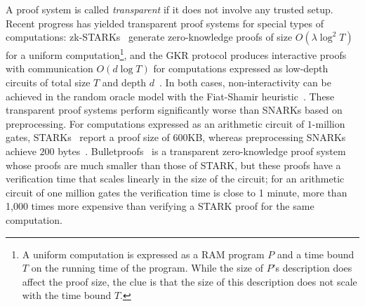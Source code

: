 A proof system is called \emph{transparent} if it does not involve any trusted setup. Recent progress has yielded transparent proof systems for special types of computations: zk-\textsf{STARK}s~\cite{C:BBHR19} generate zero-knowledge proofs of size $O(\lambda \log^2 T)$ for a uniform computation\footnote{A uniform computation is expressed as a RAM program $P$ and a time bound $T$ on the running time of the program. While the size of $P$'s description does affect the proof size, the clue is that the size of this description does not scale with the time bound $T$.}, and the GKR protocol produces interactive proofs with communication $O(d \log T)$ for computations expressed as low-depth circuits of total size $T$ and depth $d$~\cite{STOC:GolKalRot08}. In both cases, non-interactivity can be achieved in the random oracle model with the Fiat-Shamir heuristic~\cite{C:FiaSha86,STOC:CCHLRRW19}.
These transparent proof systems perform significantly worse than SNARKs based on preprocessing. For computations expressed as an arithmetic circuit of $1$-million gates, \textsf{STARK}s~\cite{C:BBHR19} report a proof size of $600$KB, whereas preprocessing SNARKs achieve $200$ bytes~\cite{EC:Groth16}. Bulletproofs~\cite{SP:BBBPWM18, EPRINT:BCCGP16} is a transparent zero-knowledge proof system whose proofs are much smaller than those of \textsf{STARK}, but these proofs have a verification time that scales linearly in the size of the circuit; for an arithmetic circuit of one million gates the verification time is close to 1 minute, more than 1,000 times more expensive than verifying a \textsf{STARK} proof for the same computation. 


